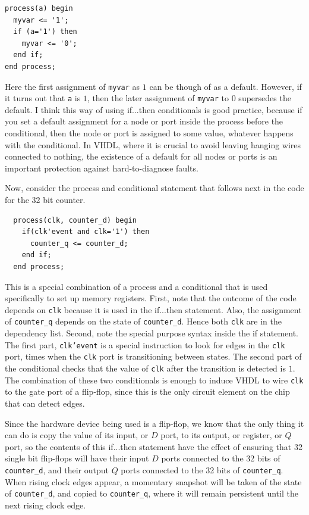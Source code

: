 \documentclass[../physical_computing.tex]{subfiles}
\begin{document}
\begin{verbatim}
process(a) begin
  myvar <= '1';
  if (a='1') then
    myvar <= '0'; 
  end if;
end process;
\end{verbatim}

Here the first assignment of \texttt{myvar} as $1$ can be though of as a default. However, if it turns out that \texttt{a} is $1$, then the later assignment of \texttt{myvar} to $0$ supersedes the default. I think this way of using if...then conditionals is good practice, because if you set a default assignment for a node or port inside the process before the conditional, then the node or port is assigned to some value, whatever happens with the conditional. In VHDL, where it is crucial to avoid leaving hanging wires connected to nothing, the existence of a default for all nodes or ports is an important protection against hard-to-diagnose faults.

Now, consider the process and conditional statement that follows next in the code for the 32 bit counter.

\begin{verbatim}
  process(clk, counter_d) begin
    if(clk'event and clk='1') then
      counter_q <= counter_d;
    end if;
  end process;
\end{verbatim}

This is a special combination of a process and a conditional that is used specifically to set up memory registers. First, note that the outcome of the code depends on \texttt{clk} because it is used in the if...then statement. Also, the assignment of \texttt{counter\_q} depends on the state of \texttt{counter\_d}. Hence both \texttt{clk} are in the dependency list. Second, note the special purpose syntax inside the if statement. The first part, \texttt{clk'event} is a special instruction to look for edges in the \texttt{clk} port, times when the \texttt{clk} port is transitioning between states. The second part of the conditional checks that the value of \texttt{clk} after the transition is detected is $1$. The combination of these two conditionals is enough to induce VHDL to wire \texttt{clk} to the gate port of a flip-flop, since this is the only circuit element on the chip that can detect edges.

Since the hardware device being used is a flip-flop, we know that the only thing it can do is copy the value of its input, or $D$ port, to its output, or register, or $Q$ port, so the contents of this if...then statement have the effect of ensuring that 32 single bit flip-flops will have their input $D$ ports connected to the 32 bits of \texttt{counter\_d}, and their output $Q$ ports connected to the 32 bits of \texttt{counter\_q}. When rising clock edges appear, a momentary snapshot will be taken of the state of \texttt{counter\_d}, and copied to \texttt{counter\_q}, where it will remain persistent until the next rising clock edge.
\end{document}
